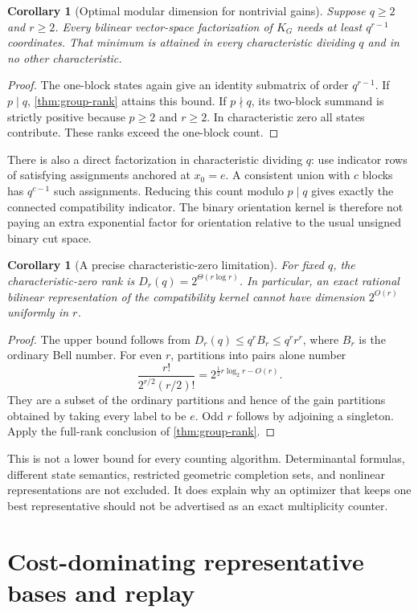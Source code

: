 \documentclass[11pt,letterpaper]{article}
\newtheorem{corollary}[theorem]{Corollary}
\theoremstyle{definition}
\begin{document}
\begin{corollary}[Optimal modular dimension for nontrivial gains]\label{cor:field-choice}
Suppose $q\ge2$ and $r\ge2$. Every bilinear vector-space factorization of $K_G$ needs at least $q^{r-1}$ coordinates. That minimum is attained in every characteristic dividing $q$ and in no other characteristic.
\end{corollary}
\begin{proof}
The one-block states again give an identity submatrix of order $q^{r-1}$. If $p\mid q$, \cref{thm:group-rank} attains this bound. If $p\nmid q$, its two-block summand is strictly positive because $p\ge2$ and $r\ge2$. In characteristic zero all states contribute. These ranks exceed the one-block count.
\end{proof}
There is also a direct factorization in characteristic dividing $q$: use indicator rows of satisfying assignments anchored at $x_0=e$. A consistent union with $c$ blocks has $q^{c-1}$ such assignments. Reducing this count modulo $p\mid q$ gives exactly the connected compatibility indicator. The binary orientation kernel is therefore not paying an extra exponential factor for orientation relative to the usual unsigned binary cut space.

\begin{corollary}[A precise characteristic-zero limitation]\label{cor:count-barrier}
For fixed $q$, the characteristic-zero rank is $D_r(q)=2^{\Theta(r\log r)}$. In particular, an exact rational bilinear representation of the compatibility kernel cannot have dimension $2^{O(r)}$ uniformly in $r$.
\end{corollary}
\begin{proof}
The upper bound follows from $D_r(q)\le q^r B_r\le q^r r^r$, where $B_r$ is the ordinary Bell number. For even $r$, partitions into pairs alone number
\[
 \frac{r!}{2^{r/2}(r/2)!}=2^{\frac12r\log_2 r-O(r)}.
\]
They are a subset of the ordinary partitions and hence of the gain partitions obtained by taking every label to be $e$. Odd $r$ follows by adjoining a singleton. Apply the full-rank conclusion of \cref{thm:group-rank}.
\end{proof}
This is not a lower bound for every counting algorithm. Determinantal formulas, different state semantics, restricted geometric completion sets, and nonlinear representations are not excluded. It does explain why an optimizer that keeps one best representative should not be advertised as an exact multiplicity counter.

\section{Cost-dominating representative bases and replay}
\label{sec:bases}
\end{document}
